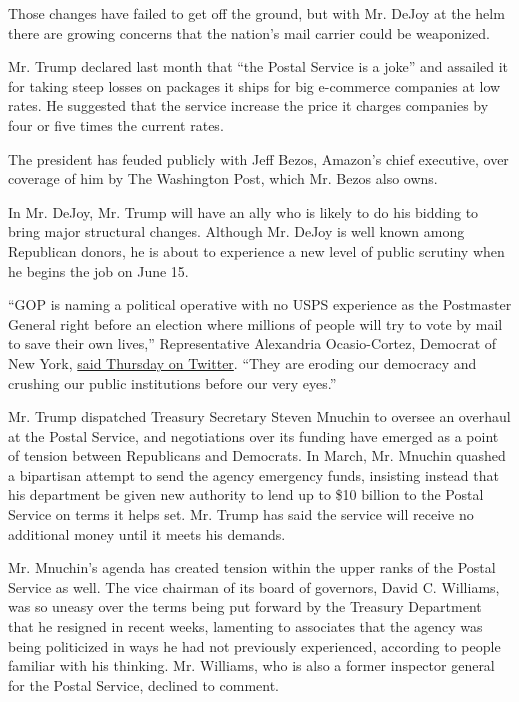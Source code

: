 Those changes have failed to get off the ground, but with Mr. DeJoy at
the helm there are growing concerns that the nation's mail carrier could
be weaponized.

Mr. Trump declared last month that ``the Postal Service is a joke'' and
assailed it for taking steep losses on packages it ships for big
e-commerce companies at low rates. He suggested that the service
increase the price it charges companies by four or five times the
current rates.

The president has feuded publicly with Jeff Bezos, Amazon's chief
executive, over coverage of him by The Washington Post, which Mr. Bezos
also owns.

In Mr. DeJoy, Mr. Trump will have an ally who is likely to do his
bidding to bring major structural changes. Although Mr. DeJoy is well
known among Republican donors, he is about to experience a new level of
public scrutiny when he begins the job on June 15.

``GOP is naming a political operative with no USPS experience as the
Postmaster General right before an election where millions of people
will try to vote by mail to save their own lives,'' Representative
Alexandria Ocasio-Cortez, Democrat of New York,
\href{https://twitter.com/AOC/status/1258382589674639360?s=20}{said
Thursday on Twitter}. ``They are eroding our democracy and crushing our
public institutions before our very eyes.''

Mr. Trump dispatched Treasury Secretary Steven Mnuchin to oversee an
overhaul at the Postal Service, and negotiations over its funding have
emerged as a point of tension between Republicans and Democrats. In
March, Mr. Mnuchin quashed a bipartisan attempt to send the agency
emergency funds, insisting instead that his department be given new
authority to lend up to \$10 billion to the Postal Service on terms it
helps set. Mr. Trump has said the service will receive no additional
money until it meets his demands.

Mr. Mnuchin's agenda has created tension within the upper ranks of the
Postal Service as well. The vice chairman of its board of governors,
David C. Williams, was so uneasy over the terms being put forward by the
Treasury Department that he resigned in recent weeks, lamenting to
associates that the agency was being politicized in ways he had not
previously experienced, according to people familiar with his thinking.
Mr. Williams, who is also a former inspector general for the Postal
Service, declined to comment.

